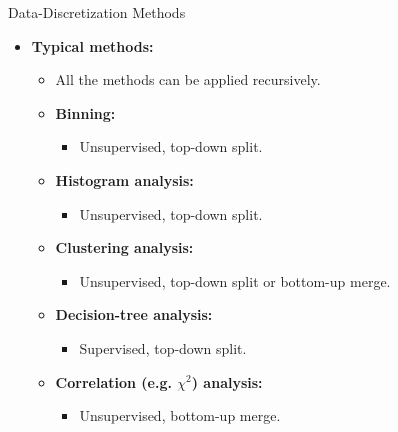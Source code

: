 \begin{frame}{Data-Discretization Methods}
	\begin{itemize}
		\item \textbf{Typical methods:}
		      \begin{itemize}
			      \item All the methods can be applied recursively.
			      \item \textbf{Binning:}
			            \begin{itemize}
				            \item Unsupervised, top-down split.
			            \end{itemize}
			      \item \textbf{Histogram analysis:}
			            \begin{itemize}
				            \item Unsupervised, top-down split.
			            \end{itemize}
			      \item \textbf{Clustering analysis:}
			            \begin{itemize}
				            \item Unsupervised, top-down split or bottom-up merge.
			            \end{itemize}
			      \item \textbf{Decision-tree analysis:}
			            \begin{itemize}
				            \item Supervised, top-down split.
			            \end{itemize}
			      \item \textbf{Correlation (e.g. $\chi^2$) analysis:}
			            \begin{itemize}
				            \item Unsupervised, bottom-up merge.
			            \end{itemize}
		      \end{itemize}
	\end{itemize}
\end{frame}

